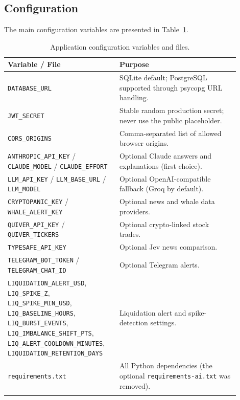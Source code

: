\subsection{Configuration}
The main configuration variables are presented in Table~\ref{tab:config}.
{\renewcommand{\arraystretch}{1.3}
\begin{longtable}{|p{0.42\linewidth}|p{0.48\linewidth}|}
\hline\textbf{Variable / File} & \textbf{Purpose}\\\hline\endhead
\texttt{DATABASE\_URL} & SQLite default; PostgreSQL supported through psycopg URL handling.\\\hline
\texttt{JWT\_SECRET} & Stable random production secret; never use the public placeholder.\\\hline
\texttt{CORS\_ORIGINS} & Comma-separated list of allowed browser origins.\\\hline
\texttt{ANTHROPIC\_API\_KEY} / \texttt{CLAUDE\_MODEL} / \texttt{CLAUDE\_EFFORT} & Optional Claude answers and explanations (first choice).\\\hline
\texttt{LLM\_API\_KEY} / \texttt{LLM\_BASE\_URL} / \texttt{LLM\_MODEL} & Optional OpenAI-compatible fallback (Groq by default).\\\hline
\texttt{CRYPTOPANIC\_KEY} / \texttt{WHALE\_ALERT\_KEY} & Optional news and whale data providers.\\\hline
\texttt{QUIVER\_API\_KEY} / \texttt{QUIVER\_TICKERS} & Optional crypto-linked stock trades.\\\hline
\texttt{TYPESAFE\_API\_KEY} & Optional Jev news comparison.\\\hline
\texttt{TELEGRAM\_BOT\_TOKEN} / \texttt{TELEGRAM\_CHAT\_ID} & Optional Telegram alerts.\\\hline
\texttt{LIQUIDATION\_ALERT\_USD}, \texttt{LIQ\_SPIKE\_Z}, \texttt{LIQ\_SPIKE\_MIN\_USD}, \texttt{LIQ\_BASELINE\_HOURS}, \texttt{LIQ\_BURST\_EVENTS}, \texttt{LIQ\_IMBALANCE\_SHIFT\_PTS}, \texttt{LIQ\_ALERT\_COOLDOWN\_MINUTES}, \texttt{LIQUIDATION\_RETENTION\_DAYS} & Liquidation alert and spike-detection settings.\\\hline
\texttt{requirements.txt} & All Python dependencies (the optional \texttt{requirements-ai.txt} was removed).\\\hline
\caption{Application configuration variables and files.}\label{tab:config}
\end{longtable}}

